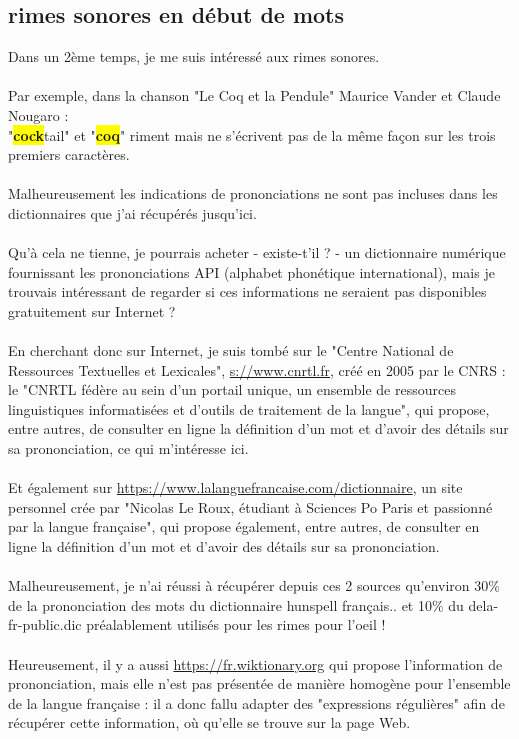 \documentclass[french]{article}
\begin{document}
\subsection{rimes sonores en début de mots}
Dans un 2ème temps, je me suis intéressé aux rimes sonores.\\
\\
Par exemple, dans la chanson "Le Coq et la Pendule" Maurice Vander et Claude Nougaro :\\
"\colorbox{yellow}{\textbf{cock}}tail" et "\colorbox{yellow}{\textbf{coq}}" riment mais ne s'écrivent pas de la même façon sur les trois premiers caractères.\\
\\
Malheureusement les indications de prononciations ne sont pas incluses dans les dictionnaires que j'ai récupérés jusqu'ici.\\
\\
Qu'à cela ne tienne, je pourrais acheter - existe-t'il ? - un dictionnaire numérique fournissant les prononciations API (alphabet phonétique international), mais je trouvais intéressant de regarder si ces informations ne seraient pas disponibles gratuitement sur Internet ?\\
\\
En cherchant donc sur Internet, je suis tombé sur le "Centre National de Ressources Textuelles et Lexicales", \url{s://www.cnrtl.fr}, créé en 2005 par le CNRS : le "CNRTL fédère au sein d’un portail unique, un ensemble de ressources linguistiques informatisées et d’outils de traitement de la langue", qui propose, entre autres, de consulter en ligne la définition d'un mot et d'avoir des détails sur sa prononciation, ce qui m'intéresse ici.\\
\\
Et également sur \url{https://www.lalanguefrancaise.com/dictionnaire}, un site personnel crée par "Nicolas Le Roux, étudiant à Sciences Po Paris et passionné par la langue française", qui propose également, entre autres, de consulter en ligne la définition d'un mot et d'avoir des détails sur sa prononciation.\\
\\
Malheureusement, je n'ai réussi à récupérer depuis ces 2 sources qu'environ 30\% de la prononciation des mots du dictionnaire hunspell français.. et 10\% du dela-fr-public.dic préalablement utilisés pour les rimes pour l'oeil !\\
\\
Heureusement, il y a aussi \url{https://fr.wiktionary.org} qui propose l'information de prononciation, mais elle n'est pas présentée de manière homogène pour l'ensemble de la langue française : il a donc fallu adapter des "expressions régulières" afin de récupérer cette information, où qu'elle se trouve sur la page Web.\\
\end{document}
